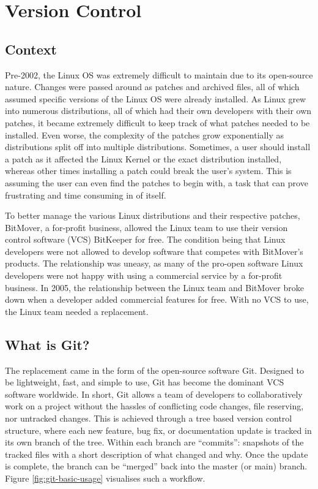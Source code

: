 \documentclass[11pt]{article}
\begin{document}
\newpage

\section{Version Control}

\subsection{Context}

Pre-2002, the Linux OS was extremely difficult to maintain due to its open-source nature. Changes were passed around as patches and archived files, all of which assumed specific versions of the Linux OS were already installed. As Linux grew into numerous distributions, all of which had their own developers with their own patches, it became extremely difficult to keep track of what patches needed to be installed. Even worse, the complexity of the patches grow exponentially as distributions split off into multiple distributions. Sometimes, a user should install a patch as it affected the Linux Kernel or the exact distribution installed, whereas other times installing a patch could break the user's system. This is assuming the user can even find the patches to begin with, a task that can prove frustrating and time consuming in of itself.

To better manage the various Linux distributions and their respective patches, BitMover, a for-profit business, allowed the Linux team to use their version control software (VCS) BitKeeper for free. The condition being that Linux developers were not allowed to develop software that competes with BitMover's products. The relationship was uneasy, as many of the pro-open software Linux developers were not happy with using a commercial service by a for-profit business. In 2005, the relationship between the Linux team and BitMover broke down when a developer added commercial features for free. With no VCS to use, the Linux team needed a replacement.

\subsection{What is Git?}

The replacement came in the form of the open-source software Git. Designed to be lightweight, fast, and simple to use, Git has become the dominant VCS software worldwide. In short, Git allows a team of developers to collaboratively work on a project without the hassles of conflicting code changes, file reserving, nor untracked changes. This is achieved through a tree based version control structure, where each new feature, bug fix, or documentation update is tracked in its own branch of the tree. Within each branch are ``commits'': snapshots of the tracked files with a short description of what changed and why. Once the update is complete, the branch can be ``merged'' back into the master (or main) branch. Figure \ref{fig:git-basic-usage} visualises such a workflow.
\end{document}
